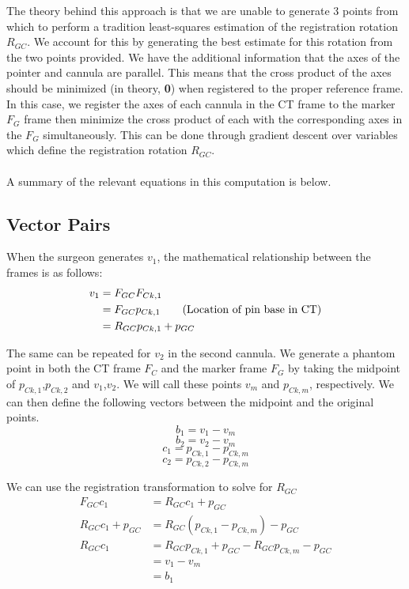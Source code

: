\documentclass[letterpaper, 11pt]{article}
\begin{document}
The theory behind this approach is that we are unable to generate 3 points from which to perform a tradition least-squares estimation of the registration rotation $R_{GC}$. We account for this by generating the best estimate for this rotation from the two points provided. We have the additional information that the axes of the pointer and cannula are parallel. This means that the cross product of the axes should be minimized (in theory, \textbf{0}) when registered to the proper reference frame. In this case, we register the axes of each cannula in the CT frame to the marker $F_G$ frame then minimize the cross product of each with the corresponding axes in the $F_{G}$ simultaneously. This can be done through gradient descent over variables which define the registration rotation $R_{GC}$. 
\\
\\
A summary of the relevant equations in this computation is below.

\subsection*{Vector Pairs}
When the surgeon generates $v_1$, the mathematical relationship between the frames is as follows:
\begin{align}
	v_1 &= F_{GC}F_{Ck,1} \notag \\
    &= F_{GC}p_{Ck,1} \tag{Location of pin base in CT} \\
    &= R_{GC}p_{Ck,1} + p_{GC} \notag
\end{align}

The same can be repeated for $v_2$ in the second cannula. We generate a phantom point in both the CT frame $F_{C}$ and the marker frame $F_{G}$ by taking the midpoint of $p_{Ck,1}$,$p_{Ck,2}$ and $v_1$,$v_2$. We will call these points $v_m$ and $p_{Ck,m}$, respectively. We can then define the following vectors between the midpoint and the original points.
$$b_1 = v_1 - v_m$$
$$b_2 = v_2 - v_m$$
$$c_1 = p_{Ck,1} - p_{Ck,m}$$
$$c_2 = p_{Ck,2} - p_{Ck,m}$$

We can use the registration transformation to solve for $R_{GC}$
\begin{align}
	F_{GC}c_1 &= R_{GC}c_1 + p_{GC} \\
    R_{GC}c_1 + p_{GC} &= R_{GC}(p_{Ck,1} - p_{Ck,m}) - p_{GC} \\
    R_{GC}c_1 &= R_{GC}p_{Ck,1} + p_{GC} - R_{GC}p_{Ck,m} - p_{GC} \\
    &= v_1 - v_m \\
    &= b_1
\end{align}
\end{document}
